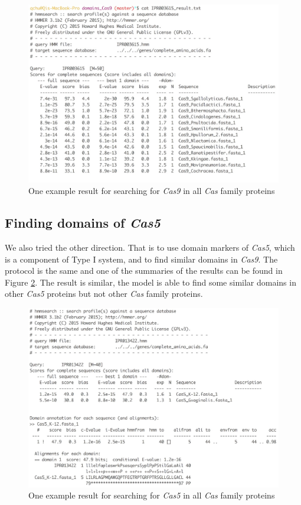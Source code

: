 \documentclass[11pt, oneside]{article}
\begin{document}
\begin{figure}[ht]
  \centering
  \includegraphics[scale = 0.3]{images/cas9Domain}
      \caption{One example result for searching for \textit{Cas9} in all \textit{Cas} family proteins}
      \label{Cas9}
\end{figure} 

\subsection{Finding domains of \textit{Cas5}}

We also tried the other direction. That is to use domain markers of \textit{Cas5}, which is a component of Type I system, and to find similar domains in \textit{Cas9}. The protocol is the same and one of the summaries of the results can be found in Figure \ref{Cas5}. The result is similar, the model is able to find some similar domains in other \textit{Cas5} proteins but not other \textit{Cas} family proteins.

\begin{figure}[ht]
  \centering
  \includegraphics[scale = 0.3]{images/cas5Domain}
      \caption{One example result for searching for \textit{Cas5} in all \textit{Cas} family proteins}
      \label{Cas5}
\end{figure} 
\end{document}
